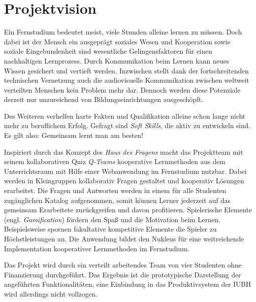 \documentclass[a4paper,11pt,listof=numbered,glossary=totoc,parskip=half,toc=bib]{scrreprt}
\begin{document}
	
	\newpage
	\setcounter{tocdepth}{1}
	\tableofcontents
	\newpage


	\chapter{Projektvision}
	
	Ein Fernstudium bedeutet meist, viele Stunden alleine lernen zu müssen. Doch dabei ist der Mensch ein ausgeprägt soziales Wesen und Kooperation sowie soziale Eingebundenheit sind wesentliche Gelingensfaktoren für einen nachhaltigen Lernprozess. Durch Kommunikation beim Lernen kann neues Wissen gesichert und vertieft werden. Inzwischen stellt dank der fortschreitenden technischen Vernetzung auch die audiovisuelle Kommunikation zwischen weltweit verteilten Menschen kein Problem mehr dar. Dennoch werden diese Potenziale derzeit nur unzureichend von Bildungseinrichtungen ausgeschöpft.
	
Des Weiteren verhelfen harte Fakten und Qualifikation alleine schon lange nicht mehr zu beruflichem Erfolg. Gefragt sind \textit{Soft Skills}, die aktiv zu entwickeln sind. Es gilt also: Gemeinsam lernt man am besten!

Inspiriert durch das Konzept des \textit{\frqq{}Haus des Fragens\flqq{}} \autocite{HausDesFragens} macht das Projektteam mit seinem kollaborativen Quiz \textit{\frqq{}Q-Teams\flqq{}} kooperative Lernmethoden aus dem Unterrichtsraum mit Hilfe einer Webanwendung im Fernstudium nutzbar. Dabei werden in Kleingruppen kollaborativ Fragen gestaltet und kooperativ Lösungen erarbeitet. Die Fragen und Antworten werden in einem für alle Studenten zugänglichen Katalog aufgenommen, somit können Lerner jederzeit auf das gemeinsam Erarbeitete zurückgreifen und davon profitieren. Spielerische Elemente (engl. \textit{Gamification}) fördern den Spaß und die Motivation beim Lernen. Beispielsweise spornen fakultative kompetitive Elemente die Spieler zu Höchstleistungen an. Die Anwendung bildet den Nukleus für eine weitreichende Implementation kooperativer Lernmethoden im Fernstudium.

Das Projekt wird durch ein verteilt arbeitendes Team von vier Studenten ohne Finanzierung durchgeführt. Das Ergebnis ist die prototypische Darstellung der angeführten Funktionalitäten, eine Einbindung in das Produktivsystem der IUBH wird allerdings nicht vollzogen.
\end{document}
